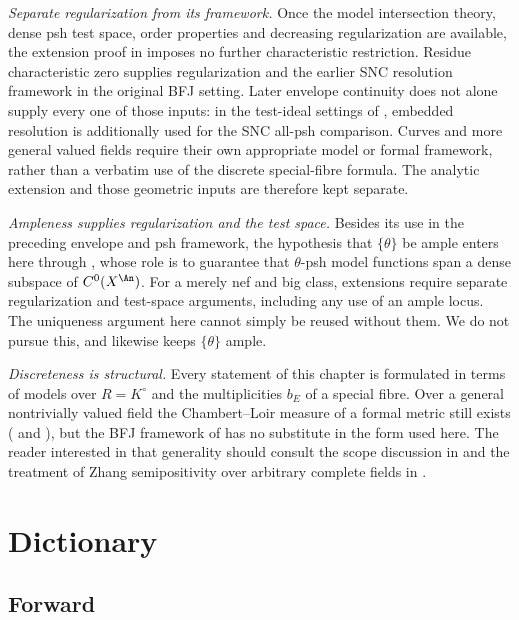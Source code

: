 \emph{Separate regularization from its framework.}  Once the model
intersection theory, dense psh test space, order properties and decreasing
regularization are available, the extension proof in
 imposes no further characteristic restriction.
Residue characteristic zero supplies regularization and the earlier SNC
resolution framework in the original BFJ setting.  Later envelope
continuity does not alone supply every one of those inputs: in the
test-ideal settings of , embedded
resolution is additionally used for the SNC all-psh comparison.  Curves
and more general valued fields require their own appropriate model or
formal framework, rather than a verbatim use of the discrete special-fibre
formula.  The analytic extension and those geometric inputs are therefore
kept separate.

\emph{Ampleness supplies regularization and the test space.}  Besides
its use in the preceding envelope and psh framework, the hypothesis that
$\{\theta\}$ be ample enters here through
, whose role is to guarantee that
$\theta$-psh model functions span a dense subspace of
$C^0(X^{\An})$.  For a merely nef and big class, extensions require
separate regularization and test-space arguments, including any use of an
ample locus.  The uniqueness argument here cannot simply be reused
without them.  We do not pursue this, and  likewise
keeps $\{\theta\}$ ample.

\emph{Discreteness is structural.}  Every statement of this chapter is
formulated in terms of models over $R=K^\circ$ and the multiplicities
$b_E$ of a special fibre.  Over a general nontrivially valued field the
Chambert--Loir measure of a formal metric still exists
( and ), but
the BFJ framework of  has no substitute in the
form used here.  The reader interested in that generality should consult the
scope discussion in  and the treatment of
Zhang semipositivity over arbitrary complete fields in \cite{GM19}.

\section{Dictionary}
\label{sec:ch24-dictionary}

\subsection{Forward}
\label{sec:ch24-dict-forward}

